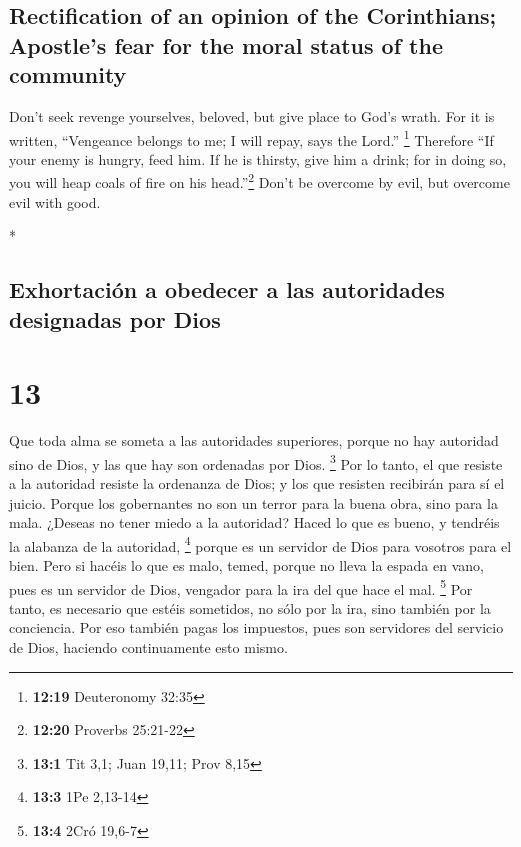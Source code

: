 \begin{paracol}{2}
\begin{otherlanguage}{english}
\hypertarget{rectification-of-an-opinion-of-the-corinthians-apostles-fear-for-the-moral-status-of-the-community}{%
\subsection{Rectification of an opinion of the Corinthians; Apostle's
fear for the moral status of the
community}\label{rectification-of-an-opinion-of-the-corinthians-apostles-fear-for-the-moral-status-of-the-community}}

 Don't seek revenge yourselves, beloved, but give place
to God's wrath. For it is written, ``Vengeance belongs to me; I will
repay, says the Lord.'' \footnote{\textbf{12:19} Deuteronomy 32:35}
 Therefore ``If your enemy is hungry, feed him. If he is
thirsty, give him a drink; for in doing so, you will heap coals of fire
on his head.''\footnote{\textbf{12:20} Proverbs 25:21-22}
 Don't be overcome by evil, but overcome evil with good.

\end{otherlanguage}

\switchcolumn[0]*

\hypertarget{exhortaciuxf3n-a-obedecer-a-las-autoridades-designadas-por-dios}{%
\subsection{Exhortación a obedecer a las autoridades designadas por
Dios}\label{exhortaciuxf3n-a-obedecer-a-las-autoridades-designadas-por-dios}}

\hypertarget{section-24}{%
\section{13}\label{section-24}}

 Que toda alma se someta a las autoridades superiores,
porque no hay autoridad sino de Dios, y las que hay son ordenadas por
Dios. \footnote{\textbf{13:1} Tit 3,1; Juan 19,11; Prov 8,15}
 Por lo tanto, el que resiste a la autoridad resiste la
ordenanza de Dios; y los que resisten recibirán para sí el juicio.
 Porque los gobernantes no son un terror para la buena
obra, sino para la mala. ¿Deseas no tener miedo a la autoridad? Haced lo
que es bueno, y tendréis la alabanza de la autoridad, \footnote{\textbf{13:3}
  1Pe 2,13-14}  porque es un servidor de Dios para
vosotros para el bien. Pero si hacéis lo que es malo, temed, porque no
lleva la espada en vano, pues es un servidor de Dios, vengador para la
ira del que hace el mal. \footnote{\textbf{13:4} 2Cró 19,6-7}
 Por tanto, es necesario que estéis sometidos, no sólo por
la ira, sino también por la conciencia.  Por eso también
pagas los impuestos, pues son servidores del servicio de Dios, haciendo
continuamente esto mismo.


\end{paracol}

